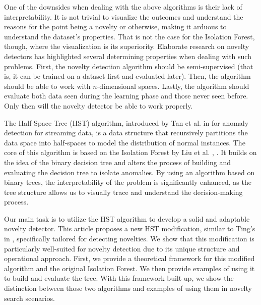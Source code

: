 One of the downsides when dealing with the above algorithms is their lack of interpretability. It is not trivial to visualize the outcomes and understand the reasons for the point being a novelty or otherwise, making it arduous to understand the dataset's properties. That is not the case for the Isolation Forest, though, where the visualization is its superiority.
Elaborate research on novelty detectors has highlighted several determining properties when dealing with such problems. First, the novelty detection algorithm should be semi-supervised (that is, it can be trained on a dataset first and evaluated later). Then, the algorithm should be able to work with \(n\)-dimensional spaces. Lastly, the algorithm should evaluate both data seen during the learning phase and those never seen before. Only then will the novelty detector be able to work properly.

The Half-Space Tree (HST) algorithm, introduced by Tan et al. in \cite{tan2011fast} for anomaly detection for streaming data, is a data structure that recursively partitions the data space into half-spaces to model the distribution of normal instances.
The core of this algorithm is based on the Isolation Forest by Liu et al. \cite{liu2008isolation}, \cite{liu2012isolation}.
It builds on the idea of the binary decision tree and alters the process of building and evaluating the decision tree to isolate anomalies. By using an algorithm based on binary trees, the interpretability of the problem is significantly enhanced, as the tree structure allows us to visually trace and understand the decision-making process.

Our main task is to utilize the HST algorithm to develop a solid and adaptable novelty detector.
This article proposes a new HST modification, similar to Ting's in \cite{ting2013mass}, specifically tailored for detecting novelties.
We show that this modification is particularly well-suited for novelty detection due to its unique structure and operational approach.
First, we provide a theoretical framework for this modified algorithm and the original Isolation Forest.
We then provide examples of using it to build and evaluate the tree.
With this framework built up, we show the distinction between those two algorithms and examples of using them in novelty search scenarios.
